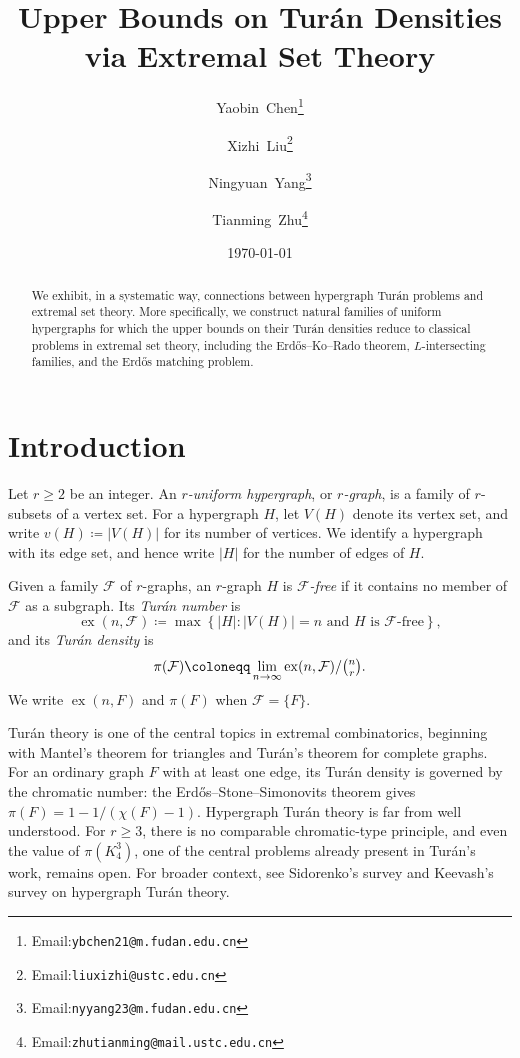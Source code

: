 \documentclass[10pt,a4paper]{article}
\title{\bf\Large Upper Bounds on Tur\'an Densities via Extremal Set Theory}
\date{\today}
\author[1]{Yaobin~Chen\thanks{Email:\texttt{ybchen21@m.fudan.edu.cn}}}
\author[2]{Xizhi~Liu\thanks{Email:\texttt{liuxizhi@ustc.edu.cn}}}
\author[3]{Ningyuan~Yang\thanks{Email:\texttt{nyyang23@m.fudan.edu.cn}}}
\author[2]{Tianming~Zhu\thanks{Email:\texttt{zhutianming@mail.ustc.edu.cn}}}
\affil[1]{\small Shanghai Center for Mathematical Sciences, Fudan University, Shanghai, China}
\affil[2]{\small School of Mathematical Sciences, University of Science and Technology of China, Hefei, China}
\affil[3]{\small School of Mathematical Sciences, Fudan University, Shanghai, China}
\theoremstyle{plain}
\theoremstyle{definition}
\theoremstyle{plain}
\DeclareMathOperator{\ex}{ex}
\newcommand{\calF}{\mathcal F}
\begin{document}
\maketitle
\begin{abstract}
    We exhibit, in a systematic way, connections between hypergraph Tur\'an problems and extremal set theory.  More specifically, we construct natural families of uniform hypergraphs for which the upper bounds on their Tur\'an densities reduce to classical problems in extremal set theory, including the Erd\H{o}s--Ko--Rado theorem, $L$-intersecting families, and the Erd\H{o}s matching problem.
\end{abstract}


\section{Introduction}\label{SEC:Introduction}

Let $r\ge2$ be an integer.  An \emph{$r$-uniform hypergraph}, or \emph{$r$-graph}, is a family of $r$-subsets of a vertex set.  For a hypergraph $H$, let $V(H)$ denote its vertex set, and write $v(H)\coloneqq |V(H)|$ for its number of vertices.  We identify a hypergraph with its edge set, and hence write $|H|$ for the number of edges of $H$.  

Given a family $\calF$ of $r$-graphs, an $r$-graph $H$ is \emph{$\calF$-free} if it contains no member of $\calF$ as a subgraph.  Its \emph{Tur\'an number} is
\[
        \ex(n,\calF)\coloneqq\max\left\{|H|: |V(H)|=n\text{ and } H\text{ is }\calF\text{-free}\right\},
\]
and its \emph{Tur\'an density} is
\[
        \pi(\calF)\coloneqq\lim_{n\to\infty}{\ex(n,\calF)}/{\tbinom{n}{r}}.
\]
We write $\ex(n,F)$ and $\pi(F)$ when $\calF=\{F\}$.

Tur\'an theory is one of the central topics in extremal combinatorics, beginning with Mantel's theorem \cite{Mantel07} for triangles and Tur\'an's theorem \cite{Turan41} for complete graphs.  For an ordinary graph $F$ with at least one edge, its Tur\'an density is governed by the chromatic number: the Erd\H{o}s--Stone--Simonovits theorem \cite{ErdosStone46,ErdosSimonovits66} gives $\pi(F)=1-1/(\chi(F)-1)$.  Hypergraph Tur\'an theory is far from well understood.  For $r\ge3$, there is no comparable chromatic-type principle, and even the value of $\pi(K_4^{3})$, one of the central problems already present in Tur\'an's work, remains open.  For broader context, see Sidorenko's survey \cite{Sidorenko95} and Keevash's survey \cite{Keevash11} on hypergraph Tur\'an theory.
\end{document}
